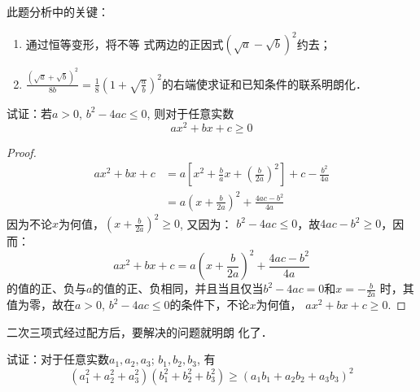 \begin{rmk}
    此题分析中的关键：
    \begin{enumerate}
        \item 通过恒等变形，将不等
    式两边的正因式$\left(\sqrt{a}-\sqrt{b}\right)^2$约去；
    \item $\frac{\left(\sqrt{a}+\sqrt{b}\right)^2}{8b}=\frac{1}{8}\left(1+\sqrt{\frac{a}{b}}\right)^2$的右端使求证和已知条件的联系明朗化．
    \end{enumerate}
\end{rmk}



\begin{example}
    试证：若$a>0$, $b^2-4ac\le 0$, 则对于任意实数
\begin{equation}
    ax^2+bx+c\ge 0
\end{equation}
\end{example}

\begin{proof}
\[\begin{split}
    ax^2+bx+c&=a\left[x^2+\frac{b}{a}x+\left(\frac{b}{2a}\right)^2\right]+c-\frac{b^2}{4a}\\
    &=a\left(x+\frac{b}{2a}\right)^2+\frac{4ac-b^2}{4a}
\end{split}\]
因为不论$x$为何值，$\left(x+\frac{b}{2a}\right)^2\ge 0$, 又因为：
$b^2-4ac\le 0$，故$4ac-b^2\ge 0$，因而：
\[ax^2+bx+c=a\left(x+\frac{b}{2a}\right)^2+\frac{4ac-b^2}{4a}\]
的值的正、负与$a$的值的正、负相同，并且当且仅当$b^2-4ac=0$和$x=-\frac{b}{2a}$
时，其值为零，故在$a>0$, $b^2-4ac\le 0$的条件下，不论$x$为何值，
$ax^2+bx+c\ge 0$.
\end{proof}

\begin{rmk}
    二次三项式经过配方后，要解决的问题就明朗
    化了．    
\end{rmk}


\begin{example}
    试证：对于任意实数$a_1,a_2,a_3$; $b_1,b_2,b_3$, 有
  \begin{equation}
      (a_1^2+a_2^2+a_3^2)(b_1^2+b_2^2+b_3^2)\ge (a_1b_1+a_2b_2+a_3b_3)^2
  \end{equation} 
\end{example}

